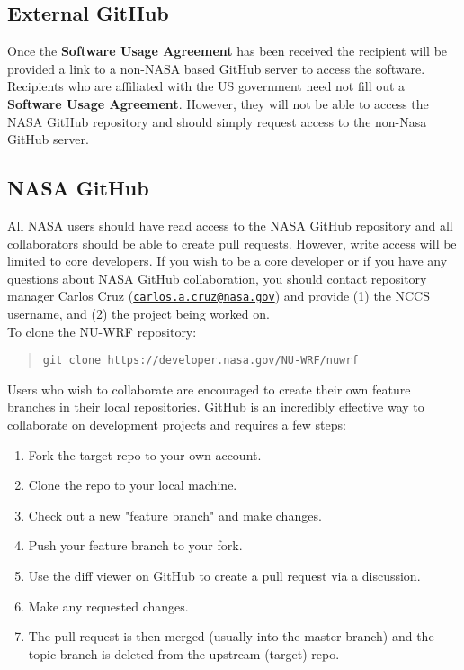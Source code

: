 \subsection{External GitHub}

Once the \textbf{Software Usage Agreement} has been received the recipient will be provided a link to a non-NASA based GitHub server to access the software. Recipients who are affiliated with the US government need not fill out a \textbf{Software Usage Agreement}. However, they will not be able to access the NASA GitHub repository and should simply request access to the non-Nasa GitHub server.


\subsection{NASA GitHub}

All NASA users should have read access to the NASA GitHub repository and all collaborators should be able to create pull requests. However, write access will be limited to core developers. If you wish to be a core developer or if you have any questions about NASA GitHub collaboration, you should contact repository manager Carlos Cruz (\href{mailto:carlos.a.cruz@nasa.gov}{\texttt{carlos.a.cruz@nasa.gov}}) and 
provide (1) the NCCS username, and (2) the project being worked on. 
\mbox{}\\

\noindent To clone the NU-WRF repository:

\begin{quote}
  \texttt{git clone https://developer.nasa.gov/NU-WRF/nuwrf}
\end{quote}

Users who wish to collaborate are encouraged to create their own feature branches in their local repositories. GitHub is an incredibly effective way to collaborate on development projects and requires a few steps:
\begin{enumerate}
\item Fork the target repo to your own account.
\item Clone the repo to your local machine.
\item Check out a new "feature branch" and make changes.
\item Push your feature branch to your fork.
\item Use the diff viewer on GitHub to create a pull request via a discussion.
\item Make any requested changes.
\item The pull request is then merged (usually into the master branch) and the topic branch is deleted from the upstream (target) repo.
\end{enumerate}


